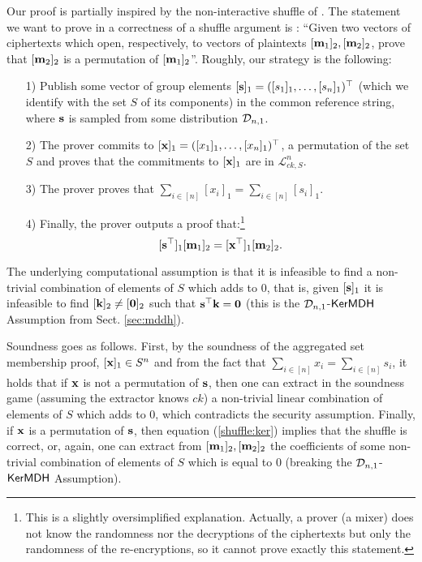 Our proof is partially inspired by the non-interactive shuffle of \cite{AC:GroLu07}. The statement we want to prove in a correctness of a shuffle argument is : ``Given two vectors of ciphertexts which open, respectively, to vectors of plaintexts $[\mathbf{m}_1]_2, [\mathbf{m}_2]_2$, prove that 
 $[\mathbf{m}_2]_2$ is a permutation of $[\mathbf{m}_1]_2$''.  Roughly, our strategy is the following:  
\begin{itemize}
\item[1)] Publish some vector of group elements $[\mathbf{s}]_1 =([s_1]_1,\ldots,[s_n]_1)^\top$ (which we identify with the set $S$ of its components) in the common reference string, where $\mathbf{s}$ is sampled from some distribution $\mathcal{D}_{n,1}$.
\item[2)] The prover commits to $[\mathbf{x}]_1=([x_1]_1,\ldots,[x_n]_1)^\top$, a permutation of the set $S$ and proves that the commitments to $[\mathbf{x}]_1$ are in $\mathcal{L}^{n}_{ck,S}$.
\item[3)] The prover proves that $\sum_{i \in [n]} [x_i]_1 =\sum_{i \in [n]} [s_i]_1$.
\item[4)] Finally, the prover outputs a proof that:\footnote{This is a slightly oversimplified explanation. 
Actually, a prover (a mixer) does not know the randomness nor the decryptions of the ciphertexts but only the randomness of the re-encryptions, so it cannot prove exactly this statement.} 
\begin{equation}\label{shuffle:ker}[\mathbf{s}^{\top}]_1 [\mathbf{m}_1]_2 =[\mathbf{x}^{\top}]_1 [\mathbf{m}_2]_2.
\end{equation}
\end{itemize}
The underlying computational assumption is that it is infeasible to find a non-trivial combination of elements of $S$ which adds to $0$, that is, given $[\mathbf{s}]_1$ it is infeasible to find $[\mathbf{k}]_2 \neq [\mathbf{0}]_2$ such that
$\mathbf{s}^{\top} \mathbf{k}=\mathbf{0}$ (this is the $\mathcal{D}_{n,1}$-$\mathsf{KerMDH}$ Assumption from Sect. \ref{sec:mddh}). 

Soundness goes as follows. First, by the soundness of the aggregated set membership proof, $[\mathbf{x}]_1 \in S^{n}$ and from the fact that 
 $\sum_{i \in [n]} x_i =\sum_{i \in [n]} s_i$, it holds that if 
 $\mathbf{x}$ is not a permutation of $\mathbf{s}$, then one can extract in the soundness game (assuming the extractor knows $ck$) a non-trivial linear combination of elements of $S$ which adds to $0$, which contradicts the security assumption. 
Finally, if $\mathbf{x}$ is a permutation of $\mathbf{s}$,  then equation (\ref{shuffle:ker}) implies that the shuffle is correct, or, again, 
one can extract from   $[\mathbf{m}_1]_2,[\mathbf{m}_2]_2$ the coefficients of some non-trivial combination of elements of $S$ which is equal to $0$ (breaking the $\mathcal{D}_{n,1}$-$\mathsf{KerMDH}$ Assumption). 

